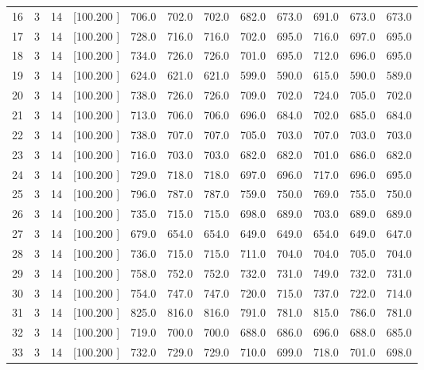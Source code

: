 \documentclass[12pt,a4paper]{article}
\begin{document}
\begin{center}
{\begin{tabular}{r r r r r r r r r r r r}
  16&  3& 14&[100.200   ]&   706.0&   702.0&   702.0&   682.0&   673.0&   691.0&   673.0&   673.0\\[-0.02in]
  17&  3& 14&[100.200   ]&   728.0&   716.0&   716.0&   702.0&   695.0&   716.0&   697.0&   695.0\\[-0.02in]
  18&  3& 14&[100.200   ]&   734.0&   726.0&   726.0&   701.0&   695.0&   712.0&   696.0&   695.0\\[-0.02in]
  19&  3& 14&[100.200   ]&   624.0&   621.0&   621.0&   599.0&   590.0&   615.0&   590.0&   589.0\\[-0.02in]
  20&  3& 14&[100.200   ]&   738.0&   726.0&   726.0&   709.0&   702.0&   724.0&   705.0&   702.0\\[-0.02in]
  21&  3& 14&[100.200   ]&   713.0&   706.0&   706.0&   696.0&   684.0&   702.0&   685.0&   684.0\\[-0.02in]
  22&  3& 14&[100.200   ]&   738.0&   707.0&   707.0&   705.0&   703.0&   707.0&   703.0&   703.0\\[-0.02in]
  23&  3& 14&[100.200   ]&   716.0&   703.0&   703.0&   682.0&   682.0&   701.0&   686.0&   682.0\\[-0.02in]
  24&  3& 14&[100.200   ]&   729.0&   718.0&   718.0&   697.0&   696.0&   717.0&   696.0&   695.0\\[-0.02in]
  25&  3& 14&[100.200   ]&   796.0&   787.0&   787.0&   759.0&   750.0&   769.0&   755.0&   750.0\\[-0.02in]
  26&  3& 14&[100.200   ]&   735.0&   715.0&   715.0&   698.0&   689.0&   703.0&   689.0&   689.0\\[-0.02in]
  27&  3& 14&[100.200   ]&   679.0&   654.0&   654.0&   649.0&   649.0&   654.0&   649.0&   647.0\\[-0.02in]
  28&  3& 14&[100.200   ]&   736.0&   715.0&   715.0&   711.0&   704.0&   704.0&   705.0&   704.0\\[-0.02in]
  29&  3& 14&[100.200   ]&   758.0&   752.0&   752.0&   732.0&   731.0&   749.0&   732.0&   731.0\\[-0.02in]
  30&  3& 14&[100.200   ]&   754.0&   747.0&   747.0&   720.0&   715.0&   737.0&   722.0&   714.0\\[-0.02in]
  31&  3& 14&[100.200   ]&   825.0&   816.0&   816.0&   791.0&   781.0&   815.0&   786.0&   781.0\\[-0.02in]
  32&  3& 14&[100.200   ]&   719.0&   700.0&   700.0&   688.0&   686.0&   696.0&   688.0&   685.0\\[-0.02in]
  33&  3& 14&[100.200   ]&   732.0&   729.0&   729.0&   710.0&   699.0&   718.0&   701.0&   698.0\\[-0.02in]

\end{tabular}}
\end{center}
\end{document}

